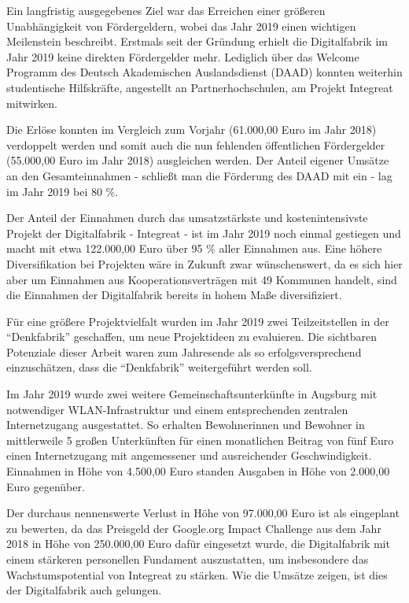 \documentclass[12pt, a4paper]{article} %
\begin{document}
Ein langfristig ausgegebenes Ziel war das Erreichen einer größeren
Unabhängigkeit von Fördergeldern, wobei das Jahr 2019 einen wichtigen
Meilenstein beschreibt. Erstmals seit der Gründung erhielt die
Digitalfabrik im Jahr 2019 keine direkten Fördergelder mehr. Lediglich
über das Welcome Programm des Deutsch Akademischen Auslandsdienst (DAAD)
konnten weiterhin studentische Hilfskräfte, angestellt an
Partnerhochschulen, am Projekt Integreat mitwirken.

Die Erlöse konnten im Vergleich zum Vorjahr (61.000,00 Euro im Jahr
2018) verdoppelt werden und somit auch die nun fehlenden öffentlichen
Fördergelder (55.000,00 Euro im Jahr 2018) ausgleichen werden. Der
Anteil eigener Umsätze an den Gesamteinnahmen - schließt man die
Förderung des DAAD mit ein - lag im Jahr 2019 bei 80 \%.

Der Anteil der Einnahmen durch das umsatzstärkste und kostenintensivste
Projekt der Digitalfabrik - Integreat - ist im Jahr 2019 noch einmal
gestiegen und macht mit etwa 122.000,00 Euro über 95 \% aller Einnahmen
aus. Eine höhere Diversifikation bei Projekten wäre in Zukunft zwar
wünschenswert, da es sich hier aber um Einnahmen aus
Kooperationsverträgen mit 49 Kommunen handelt, sind die Einnahmen der
Digitalfabrik bereits in hohem Maße diversifiziert.

Für eine größere Projektvielfalt wurden im Jahr 2019 zwei
Teilzeitstellen in der “Denkfabrik” geschaffen, um neue Projektideen zu
evaluieren. Die sichtbaren Potenziale dieser Arbeit waren zum Jahresende
als so erfolgsversprechend einzuschätzen, dass die “Denkfabrik”
weitergeführt werden soll.

Im Jahr 2019 wurde zwei weitere Gemeinschaftsunterkünfte in Augsburg mit
notwendiger WLAN-Infrastruktur und einem entsprechenden zentralen
Internetzugang ausgestattet. So erhalten Bewohnerinnen und Bewohner in
mittlerweile 5 großen Unterkünften für einen monatlichen Beitrag von
fünf Euro einen Internetzugang mit angemessener und ausreichender
Geschwindigkeit. Einnahmen in Höhe von 4.500,00 Euro standen Ausgaben in
Höhe von 2.000,00 Euro gegenüber.

Der durchaus nennenswerte Verlust in Höhe von 97.000,00 Euro ist als
eingeplant zu bewerten, da das Preisgeld der Google.org Impact Challenge
aus dem Jahr 2018 in Höhe von 250.000,00 Euro dafür eingesetzt wurde,
die Digitalfabrik mit einem stärkeren personellen Fundament
auszustatten, um insbesondere das Wachstumspotential von Integreat zu
stärken. Wie die Umsätze zeigen, ist dies der Digitalfabrik auch
gelungen.
\end{document}
